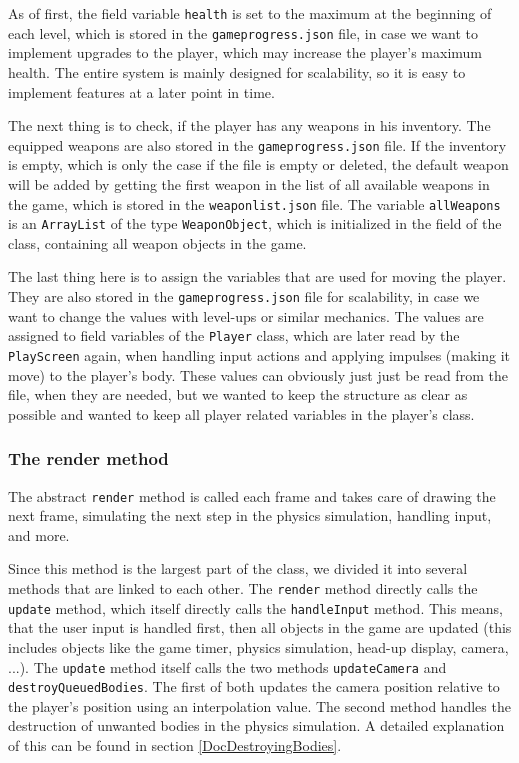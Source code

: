 \documentclass[12p]{article}
\begin{document}
As of first, the field variable \texttt{health} is set to the maximum at the beginning of each level, which is stored in the \texttt{gameprogress.json} file, in case we want to implement upgrades to the player, which may increase the player's maximum health. The entire system is mainly designed for scalability, so it is easy to implement features at a later point in time.

The next thing is to check, if the player has any weapons in his inventory. The equipped weapons are also stored in the \texttt{gameprogress.json} file. If the inventory is empty, which is only the case if the file is empty or deleted, the default weapon will be added by getting the first weapon in the list of all available weapons in the game, which is stored in the \texttt{weaponlist.json} file. The variable \texttt{allWeapons} is an \texttt{ArrayList} of the type \texttt{WeaponObject}, which is initialized in the field of the class, containing all weapon objects in the game.

The last thing here is to assign the variables that are used for moving the player. They are also stored in the \texttt{gameprogress.json} file for scalability, in case we want to change the values with level-ups or similar mechanics. The values are assigned to field variables of the \texttt{Player} class, which are later read by the \texttt{PlayScreen} again, when handling input actions and applying impulses (making it move) to the player's body. These values can obviously just just be read from the file, when they are needed, but we wanted to keep the structure as clear as possible and wanted to keep all player related variables in the player's class.

\subsubsection{The render method}

The abstract \texttt{render} method is called each frame and takes care of drawing the next frame, simulating the next step in the physics simulation, handling input, and more.

Since this method is the largest part of the class, we divided it into several methods that are linked to each other. The \texttt{render} method directly calls the \texttt{update} method, which itself directly calls the \texttt{handleInput} method. This means, that the user input is handled first, then all objects in the game are updated (this includes objects like the game timer, physics simulation, head-up display, camera, ...). The \texttt{update} method itself calls the two methods \texttt{updateCamera} and \texttt{destroyQueuedBodies}. The first of both updates the camera position relative to the player's position using an interpolation value. The second method handles the destruction of unwanted bodies in the physics simulation. A detailed explanation of this can be found in section \ref{DocDestroyingBodies}.
\end{document}
